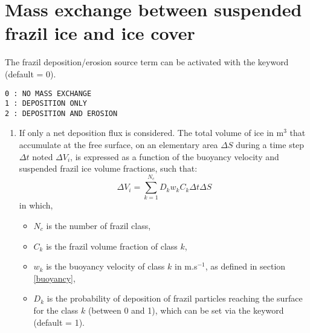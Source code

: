 \section{Mass exchange between suspended frazil ice and ice cover}
\label{section:mass_exchanges}

The frazil deposition/erosion source term can be activated with the keyword  (default = 0).
\begin{lstlisting}
0 : NO MASS EXCHANGE
1 : DEPOSITION ONLY
2 : DEPOSITION AND EROSION
\end{lstlisting}

\begin{enumerate}
\item If  only a net deposition flux is considered.
The total volume of ice in m$^3$ that accumulate at the free surface, on an elementary area $\Delta S$ during a time step $\Delta t$ noted $\Delta V_i$, is expressed as a function of the buoyancy velocity and suspended frazil ice volume fractions, such that:
\begin{equation}
\Delta V_i = \sum_{k=1}^{N_c} D_k w_k C_k  \Delta t \Delta S 
\end{equation}
in which,
\begin{itemize}
  \item $N_c$ is the number of frazil class,
  \item $C_k$ is the frazil volume fraction of class $k$,
  \item $w_k$ is the buoyancy velocity of class $k$ in m.s$^{-1}$, as defined in section \ref{buoyancy},
  \item $D_k$ is the probability of deposition of frazil particles reaching the surface for the class $k$ (between 0 and 1), which can be set via the keyword  (default = 1).
\end{itemize}


\end{enumerate}
